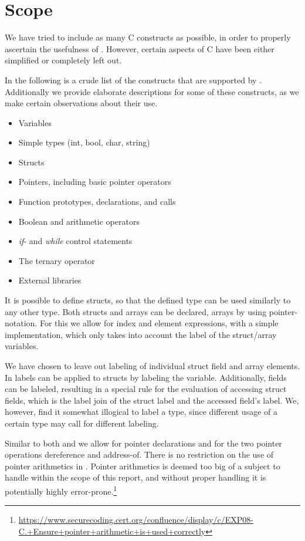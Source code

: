 
\section{Scope}\label{ctif:scope}
We have tried to include as many C constructs as possible, in order to properly ascertain the usefulness of \thelang.
However, certain aspects of C have been either simplified or completely left out.

In the following is a crude list of the constructs that are supported by \thelang.
Additionally we provide elaborate descriptions for some of these constructs, as we make certain observations about their use.

\begin{itemize}
  \item Variables
  \item Simple types (int, bool, char, string)
  \item Structs
  \item Pointers, including basic pointer operators
  \item Function prototypes, declarations, and calls
  \item Boolean and arithmetic operators
  \item \emph{if}- and \emph{while} control statements
  \item The ternary operator
  \item External libraries
\end{itemize}

It is possible to define structs, so that the defined type can be used similarly to any other type.
Both structs and arrays can be declared, arrays by using pointer-notation.
For this we allow for index and element expressions, with a simple implementation, which only takes into account the label of the struct/array variables.

We have chosen to leave out labeling of individual struct field and array elements.
In \cite{myers1997} labels can be applied to structs by labeling the variable.
Additionally, fields can be labeled, resulting in a special rule for the evaluation of accessing struct fields, which is the label join of the struct label and the accessed field's label.
We, however, find it somewhat illogical to label a type, since different usage of a certain type may call for different labeling.

Similar to both \cite{muller2015cif} and \cite{maciazek2016cbif} we allow for pointer declarations and for the two pointer operations dereference and address-of.
There is no restriction on the use of pointer arithmetics in \thelang.
Pointer arithmetics is deemed too big of a subject to handle within the scope of this report, and without proper handling it is potentially highly error-prone.\footnote{\url{https://www.securecoding.cert.org/confluence/display/c/EXP08-C.+Ensure+pointer+arithmetic+is+used+correctly}}

